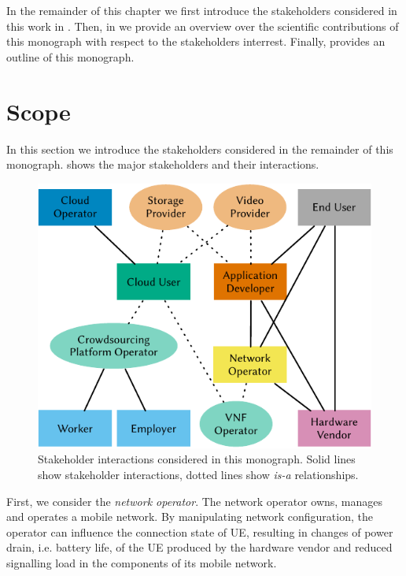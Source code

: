 In the remainder of this chapter we first introduce the stakeholders considered in this work in .
Then, in  we provide an overview over the scientific contributions of this monograph with respect to the stakeholders interrest.
Finally,  provides an outline of this monograph.

\section{Scope}\label{sec:introduction:considered_stakeholders}

In this section we introduce the stakeholders considered in the remainder of this monograph.
 shows the major stakeholders and their interactions.

\begin{figure}
\centering
\includegraphics{figures/stakeholders}
\caption{Stakeholder interactions considered in this monograph. Solid lines show stakeholder interactions, dotted lines show \emph{is-a} relationships.}\label{fig:introduction:stakeholders}
\end{figure}

First, we consider the \emph{network operator}.
The network operator owns, manages and operates a mobile network.
By manipulating network configuration, the operator can influence the connection state of \gls{UE}, resulting in changes of power drain, i.e. battery life, of the \gls{UE} produced by the hardware vendor and reduced signalling load in the components of its mobile network.

